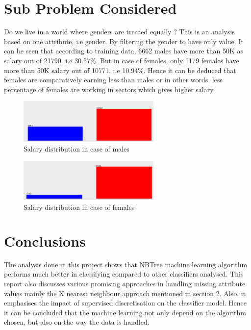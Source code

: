 \documentclass[11pt]{article}
\begin{document}
\section{Sub Problem Considered}
Do we live in a world where genders are treated equally ?
This is an analysis based on one attribute, i.e gender. By filtering the gender to have only value. It can be seen that according to training data, 6662 males have more than 50K as salary out of 21790. i.e 30.57\%. But in case of females, only 1179 females have more than 50K salary out of 10771. i.e 10.94\%. Hence it can be deduced that females are comparatively earning less than males or in other words, less percentage of females are working in sectors which gives higher salary.

\begin{figure}[h]
\includegraphics[width=7cm]{Screen_Shot_2014-06-01_at_11_39_19_AM.png}
\caption{Salary distribution in case of males}
\end{figure}

\begin{figure}[h]
\includegraphics[width=7cm]{Screen_Shot_2014-06-01_at_11_58_00_AM.png}
\caption{Salary distribution in case of females}
\end{figure}

\section{Conclusions}
The analysis done in this project shows that NBTree machine learning algorithm performs much better in classifying compared to other classifiers analysed. This report also discusses various promising approaches in handling missing attribute values mainly the K nearest neighbour approach mentioned in section 2. Also, it emphasises the impact of supervised discretisation on the classifier model. Hence it can be concluded that the machine learning not only depend on the algorithm chosen, but also on the way the data is handled. 




\end{document}
